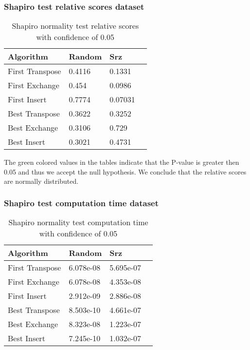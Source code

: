 \documentclass[]{article}
\begin{document}
	\subsubsection{Shapiro test relative scores dataset}
	\begin{table}[H]
		\centering
		\caption{Shapiro normality test relative scores with confidence of 0.05}
		\label{tab:table1}
		\begin{tabular}{l{|}lll}
			\toprule
			Algorithm & Random & Srz\\
			\midrule
			First Transpose &\color{Red}0.4116&\color{Red}0.1331\\ 
			First Exchange  &\color{Red}0.454&\color{Red}0.0986\\ 
			First Insert 	&\color{Red}0.7774&\color{Red}0.07031\\ 
			Best Transpose &\color{Red}0.3622&\color{Red}0.3252\\ 
			Best Exchange  &\color{Red}0.3106&\color{Red}0.729\\ 
			Best Insert 	&\color{Red}0.3021&\color{Red}0.4731\\	
			\bottomrule
		\end{tabular}
	\end{table}
	
	The green colored values in the tables indicate that the P-value is greater then 0.05 and thus we accept the null hypothesis.
	We conclude that the relative scores are normally distributed.
	
	\subsubsection{Shapiro test computation time dataset}
	\begin{table}[H]
		\centering
		\caption{Shapiro normality test computation time with confidence of 0.05}
		\label{tab:table1}
		\begin{tabular}{l{|}lll}
			\toprule
			Algorithm & Random & Srz\\
			\midrule
			First Transpose &\color{OliveGreen}6.078e-08&\color{OliveGreen}5.695e-07\\ 
			First Exchange  &\color{OliveGreen}6.078e-08&\color{OliveGreen}4.353e-08
			\\ 
			First Insert 	&\color{OliveGreen}2.912e-09&\color{OliveGreen}2.886e-08\\ 
			Best Transpose & \color{OliveGreen}8.503e-10&\color{OliveGreen}4.661e-07\\ 
			Best Exchange  &\color{OliveGreen}8.323e-08&\color{OliveGreen} 1.223e-07\\ 
			Best Insert 	&\color{OliveGreen}7.245e-10&\color{OliveGreen}1.032e-07\\	
			\bottomrule
		\end{tabular}
	\end{table}
	
\end{document}
